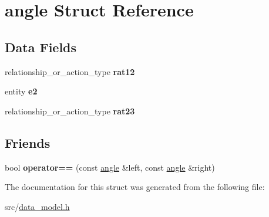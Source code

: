 \hypertarget{structangle}{}\section{angle Struct Reference}
\label{structangle}
\subsection*{Data Fields}
\begin{DoxyCompactItemize}
\item 
\mbox{\label{structangle_ae2506f4585814e8db2472cc9665bc230}} 
relationship\+\_\+or\+\_\+action\+\_\+type {\bfseries rat12}
\item 
\mbox{\label{structangle_a8be7ceadded85927d37e07a37f73e126}} 
entity {\bfseries e2}
\item 
\mbox{\label{structangle_a718f64e8c5e13b0d0a3be99a034b87fe}} 
relationship\+\_\+or\+\_\+action\+\_\+type {\bfseries rat23}
\end{DoxyCompactItemize}
\subsection*{Friends}
\begin{DoxyCompactItemize}
\item 
\mbox{\label{structangle_a08af3ce953cf2a9246fc60278c929a52}} 
bool {\bfseries operator==} (const \hyperlink{structangle}{angle} \&left, const \hyperlink{structangle}{angle} \&right)
\end{DoxyCompactItemize}


The documentation for this struct was generated from the following file\+:\begin{DoxyCompactItemize}
\item 
src/\hyperlink{data__model_8h}{data\+\_\+model.\+h}\end{DoxyCompactItemize}
